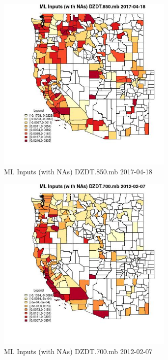 \begin{figure} 
\centering  
\includegraphics[width=0.77\textwidth]{Code_Outputs/Report_ML_input_PM25_Step4_part_f_de_duplicated_aveswNAs_CountyDZDT850mbMean2017-04-18.jpg} 
\caption{\label{fig:Report_ML_input_PM25_Step4_part_f_de_duplicated_aveswNAsCountyDZDT850mbMean2017-04-18}ML Inputs (with NAs) DZDT.850.mb 2017-04-18} 
\end{figure} 
 

\begin{figure} 
\centering  
\includegraphics[width=0.77\textwidth]{Code_Outputs/Report_ML_input_PM25_Step4_part_f_de_duplicated_aveswNAs_CountyDZDT700mbMean2012-02-07.jpg} 
\caption{\label{fig:Report_ML_input_PM25_Step4_part_f_de_duplicated_aveswNAsCountyDZDT700mbMean2012-02-07}ML Inputs (with NAs) DZDT.700.mb 2012-02-07} 
\end{figure} 
 

